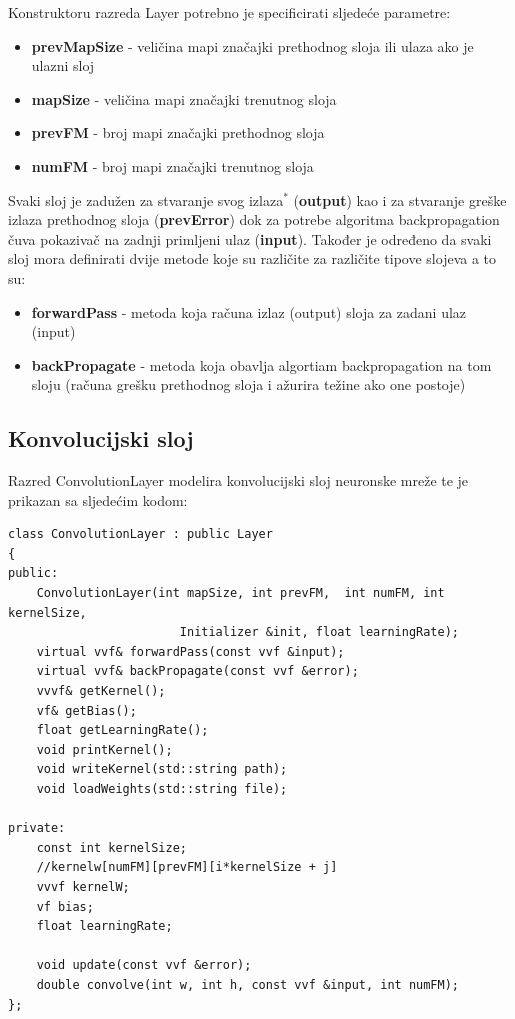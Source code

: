 \documentclass[times, utf8, zavrsni, numeric]{fer}
\begin{document}
Konstruktoru razreda Layer potrebno je specificirati sljedeće parametre:
\begin{itemize}
\item \textbf{prevMapSize} - veličina mapi značajki prethodnog sloja ili ulaza ako je ulazni sloj
\item \textbf{mapSize} - veličina mapi značajki trenutnog sloja
\item \textbf{prevFM} - broj mapi značajki prethodnog sloja
\item \textbf{numFM} - broj mapi značajki trenutnog sloja
\end{itemize}

Svaki sloj je zadužen za stvaranje svog izlaza$^*$ (\textbf{output}) kao i za stvaranje greške izlaza prethodnog sloja (\textbf{prevError}) dok za potrebe algoritma backpropagation čuva pokazivač na zadnji primljeni ulaz (\textbf{input}). Također je određeno da svaki sloj mora definirati dvije metode koje su različite za različite tipove slojeva a to su:
\begin{itemize}
\item \textbf{forwardPass} - metoda koja računa izlaz (output) sloja za zadani ulaz (input)
\item \textbf{backPropagate} - metoda koja obavlja algortiam backpropagation na tom sloju (računa grešku prethodnog sloja i ažurira težine ako one postoje)
\end{itemize}

\subsection{Konvolucijski sloj}
Razred ConvolutionLayer modelira konvolucijski sloj neuronske mreže te je prikazan sa sljedećim kodom:
\begin{lstlisting}[caption=Razred ConvolutionLayer,
  label=ConvLayer]
class ConvolutionLayer : public Layer
{
public:
    ConvolutionLayer(int mapSize, int prevFM,  int numFM, int kernelSize, 
    					Initializer &init, float learningRate); 
    virtual vvf& forwardPass(const vvf &input);
    virtual vvf& backPropagate(const vvf &error);
    vvvf& getKernel();
    vf& getBias();
    float getLearningRate();
    void printKernel();
    void writeKernel(std::string path);
    void loadWeights(std::string file);

private:
    const int kernelSize;
    //kernelw[numFM][prevFM][i*kernelSize + j]
    vvvf kernelW;
    vf bias;
    float learningRate;

    void update(const vvf &error);
    double convolve(int w, int h, const vvf &input, int numFM);
};
\end{lstlisting}
\end{document}
